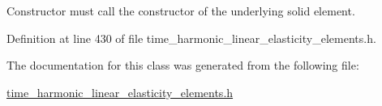 Constructor must call the constructor of the underlying solid element. 



Definition at line 430 of file time\+\_\+harmonic\+\_\+linear\+\_\+elasticity\+\_\+elements.\+h.



The documentation for this class was generated from the following file\+:\begin{DoxyCompactItemize}
\item 
\hyperlink{time__harmonic__linear__elasticity__elements_8h}{time\+\_\+harmonic\+\_\+linear\+\_\+elasticity\+\_\+elements.\+h}\end{DoxyCompactItemize}
